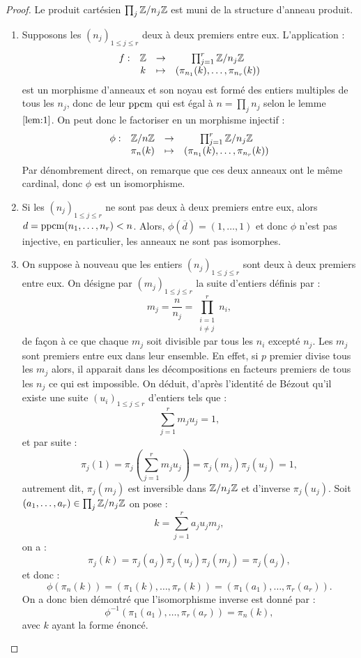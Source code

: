 \begin{proof}
Le produit cartésien $\prod_j \mathbb{Z}/n_j\mathbb{Z}$ est muni de la structure d'anneau produit.
\begin{enumerate}[label=(\roman*)]

\item
Supposons les $(n_j)_{1 \leq j \leq r}$ deux à deux premiers entre eux.
L'application :
\[ \begin{array}{c c c c}
f : & \mathbb{Z} & \to & \prod_{j=1}^r \mathbb{Z}/n_j\mathbb{Z} \\
& k & \mapsto & (\pi_{n_1}(k), \dots, \pi_{n_r}(k))
\end{array} \]
est un morphisme d'anneaux et son noyau est formé des entiers multiples de tous les $n_j$, donc de leur $\operatorname{ppcm}$ qui est égal à
$n=\prod_j n_j$ selon le lemme $\ref{lem:1}$. On peut donc le factoriser en un morphisme injectif :
\[ \begin{array}{c c c c}
\phi : & \mathbb{Z}/n\mathbb{Z} & \to & \prod_{j=1}^r \mathbb{Z}/n_j\mathbb{Z} \\
& \pi_n(k) & \mapsto & (\pi_{n_1}(k), \dots, \pi_{n_r}(k))
\end{array} \]
Par dénombrement direct, on remarque que ces deux anneaux ont le même cardinal, donc $\phi$ est un isomorphisme.

\item
Si les $(n_j)_{1 \leq j \leq r}$ ne sont pas deux à deux premiers entre eux, alors $d = \operatorname{ppcm}(n_1, \dots, n_r) < n$.
Alors, $\phi(\overline{d}) = (1, \dots, 1)$ et donc $\phi$ n'est pas injective, en particulier, les anneaux ne sont pas isomorphes.

\item
On suppose à nouveau que les entiers $(n_j)_{1 \leq j \leq r}$ sont deux à deux premiers entre eux.
On désigne par $(m_j)_{1 \leq j \leq r}$ la suite d'entiers définis par :
\[ m_j = \dfrac{n}{n_j} = \prod_{\substack{i=1 \\ i \neq j}}^r n_i , \]
de façon à ce que chaque $m_j$ soit divisible par tous les $n_i$ excepté $n_j$.
Les $m_j$ sont premiers entre eux dans leur ensemble. 
En effet, si $p$ premier divise tous les $m_j$ alors, il apparait dans les décompositions en facteurs premiers de tous les $n_j$ ce qui est
impossible.
On déduit, d'après l'identité de Bézout qu'il existe une suite $(u_i)_{1 \leq j \leq r}$ d'entiers tels que :
\[ \sum_{j=1}^r m_j u_j = 1 , \]
et par suite :
\[ \pi_j(1) = \pi_j \left ( \sum_{j=1}^r m_j u_j  \right ) = \pi_j(m_j) \pi_j(u_j) = 1 , \]
autrement dit, $ \pi_j(m_j)$ est inversible dans $\mathbb{Z}/n_j\mathbb{Z}$ et d'inverse $\pi_j(u_j)$.
Soit $(a_1, \dots, a_r) \in \prod_j \mathbb{Z}/n_j\mathbb{Z}$ on pose :
\[ k = \sum_{j=1}^r a_j u_j m_j , \]
on a :
\[ \pi_j(k) = \pi_j(a_j)\pi_j(u_j)\pi_j(m_j) = \pi_j(a_j) , \]
et donc :
\[ \phi(\pi_n(k)) = (\pi_1(k), \dots, \pi_r(k)) = (\pi_1(a_1), \dots, \pi_r(a_r)) . \]
On a donc bien démontré que l'isomorphisme inverse est donné par :
\[ \phi^{-1}(\pi_1(a_1), \dots, \pi_r(a_r)) = \pi_n(k) , \]
avec $k$ ayant la forme énoncé.
\end{enumerate}
\end{proof}

